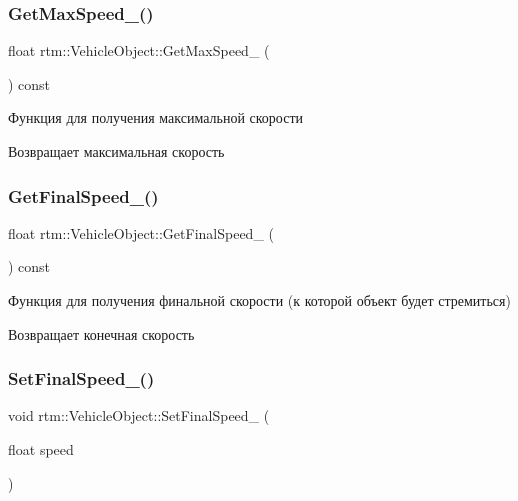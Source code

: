 \subsubsection{\texorpdfstring{Get\+Max\+Speed\+\_\+()}{GetMaxSpeed\_()}}
{\footnotesize\ttfamily float rtm\+::\+Vehicle\+Object\+::\+Get\+Max\+Speed\+\_\+ (\begin{DoxyParamCaption}{ }\end{DoxyParamCaption}) const\hspace{0.3cm}{\ttfamily [protected]}}



Функция для получения максимальной скорости 

\begin{DoxyReturn}{Возвращает}
максимальная скорость 
\end{DoxyReturn}
\mbox{\label{classrtm_1_1_vehicle_object_a6cf4eb12c1eaf80b7f1e95ab206deae9}} 
\subsubsection{\texorpdfstring{Get\+Final\+Speed\+\_\+()}{GetFinalSpeed\_()}}
{\footnotesize\ttfamily float rtm\+::\+Vehicle\+Object\+::\+Get\+Final\+Speed\+\_\+ (\begin{DoxyParamCaption}{ }\end{DoxyParamCaption}) const\hspace{0.3cm}{\ttfamily [protected]}}



Функция для получения финальной скорости (к которой объект будет стремиться) 

\begin{DoxyReturn}{Возвращает}
конечная скорость 
\end{DoxyReturn}
\mbox{\label{classrtm_1_1_vehicle_object_a0339478b106ebe22b63a6d076204cc22}} 
\subsubsection{\texorpdfstring{Set\+Final\+Speed\+\_\+()}{SetFinalSpeed\_()}}
{\footnotesize\ttfamily void rtm\+::\+Vehicle\+Object\+::\+Set\+Final\+Speed\+\_\+ (\begin{DoxyParamCaption}\item[{float}]{speed }\end{DoxyParamCaption})\hspace{0.3cm}{\ttfamily [protected]}}



